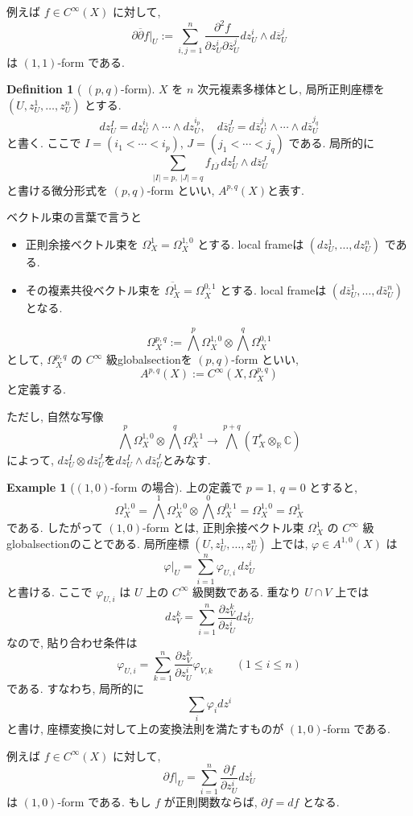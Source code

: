\documentclass[dvipdfmx,a4paper,11pt]{article} %
\theoremstyle{definition}
\newtheorem{defn}[thm]{Definition}
\newtheorem{example}[thm]{Example}
\theoremstyle{remark}
\numberwithin{equation}{section}
\begin{document}
例えば \(f\in C^\infty(X)\) に対して,
\[
\partial\overline{\partial} f|_{U}
:=
\sum_{i,j=1}^n
\frac{\partial^2 f}{\partial z_U^i\partial \overline{z}_U^j}
dz_U^i\wedge d\overline{z}_U^j
\]
は \((1,1)\)-form である.


\begin{defn}[ \((p,q)\)-form]
\(X\) を \(n\) 次元複素多様体とし, 局所正則座標を \((U,z_U^1,\ldots,z_U^n)\) とする.
\[
dz_U^I
=
dz_U^{i_1}\wedge \cdots \wedge dz_U^{i_p},
\quad
d\overline{z}_U^J
=
d\overline{z}_U^{j_1}\wedge \cdots \wedge d\overline{z}_U^{j_q}
\]
と書く. ここで \(I=(i_1<\cdots<i_p)\), \(J=(j_1<\cdots<j_q)\) である. 局所的に
\[
\sum_{|I|=p,\ |J|=q}
f_{I\overline J}\,
dz_U^I\wedge d\overline{z}_U^J
\]
と書ける微分形式を \((p,q)\)-form といい, \(
A^{p,q}(X)\)と表す.

ベクトル束の言葉で言うと
\begin{itemize}
\item 正則余接ベクトル束を
\(
\Omega_X^1=\Omega_X^{1,0}
\)
とする. local frameは
\(
(dz_U^1,\ldots,dz_U^n)
\)
である. 
\item その複素共役ベクトル束を
\(
\overline{\Omega_X^1}=\Omega_X^{0,1}
\)
とする. local frameは
\(
(d\overline{z}_U^1,\ldots,d\overline{z}_U^n)
\)
となる. 
\end{itemize}
\[
\Omega_X^{p,q}:=\bigwedge^p \Omega_X^{1,0}\otimes \bigwedge^q \Omega_X^{0,1}
\]
として, \(\Omega_X^{p,q}\) の \(C^\infty\) 級globalsectionを \((p,q)\)-form といい, 
\[
A^{p,q}(X):=C^\infty(X,\Omega_X^{p,q})
\]
と定義する. 

 ただし, 自然な写像
\[
\bigwedge^p \Omega_X^{1,0}\otimes \bigwedge^q \Omega_X^{0,1}
\longrightarrow
\bigwedge^{p+q}(T_X^*\otimes_{\mathbb R}\mathbb C)
\]
によって,
\(
dz_U^I\otimes d\overline{z}_U^J
\text{を}
dz_U^I\wedge d\overline{z}_U^J
\text{とみなす. }
\)
\end{defn}



\begin{example}[\((1,0)\)-form の場合]
上の定義で \(p=1,\ q=0\) とすると,
\[
\Omega_X^{1,0}
=
\bigwedge^1\Omega_X^{1,0}\otimes \bigwedge^0\Omega_X^{0,1}
=
\Omega_X^{1,0}
=
\Omega_X^1
\]
である. したがって \((1,0)\)-form とは, 正則余接ベクトル束 \(\Omega_X^1\) の \(C^\infty\) 級globalsectionのことである. 局所座標 \((U,z_U^1,\ldots,z_U^n)\) 上では, \(\varphi\in A^{1,0}(X)\) は
\[
\varphi|_{U}
=
\sum_{i=1}^n \varphi_{U,i}\,dz_U^i
\]
と書ける. ここで \(\varphi_{U,i}\) は \(U\) 上の \(C^\infty\) 級関数である. 重なり \(U\cap V\) 上では
\[
dz_V^k
=
\sum_{i=1}^n
\frac{\partial z_V^k}{\partial z_U^i}
dz_U^i
\]
なので, 貼り合わせ条件は
\[
\varphi_{U,i}
=
\sum_{k=1}^n
\frac{\partial z_V^k}{\partial z_U^i}
\varphi_{V,k}
\qquad
(1\leq i\leq n)
\]
である. すなわち, 局所的に
\[
\sum_i \varphi_i dz^i
\]
と書け, 座標変換に対して上の変換法則を満たすものが \((1,0)\)-form である.

例えば \(f\in C^\infty(X)\) に対して,
\[
\partial f|_{U}
=
\sum_{i=1}^n
\frac{\partial f}{\partial z_U^i}
dz_U^i
\]
は \((1,0)\)-form である. もし \(f\) が正則関数ならば, \(\partial f=df\) となる.
\end{example}
\end{document}

